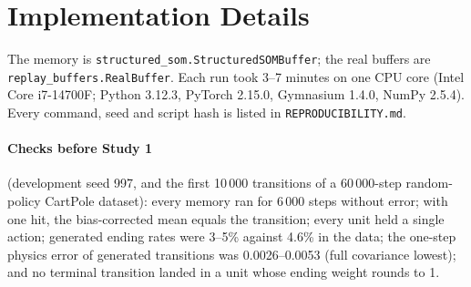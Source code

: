 \documentclass{article}
\begin{document}
\section{Implementation Details}
\label{app:impl}

The memory is \texttt{structured\_som.StructuredSOMBuffer}; the real buffers
are \texttt{replay\_buffers.RealBuffer}. Each run took 3--7 minutes on one
CPU core (Intel Core i7-14700F; Python 3.12.3, PyTorch 2.15.0, Gymnasium
1.4.0, NumPy 2.5.4). Every command, seed and script hash is listed in
\texttt{REPRODUCIBILITY.md}.

\paragraph{Checks before Study 1} (development seed 997, and the first
10\,000 transitions of a 60\,000-step random-policy CartPole dataset): every
memory ran for 6\,000 steps without error; with one hit, the bias-corrected
mean equals the transition; every unit held a single action; generated
ending rates were 3--5\% against 4.6\% in the data; the one-step physics
error of generated transitions was 0.0026--0.0053 (full covariance lowest);
and no terminal transition landed in a unit whose ending weight rounds to 1.
\end{document}
